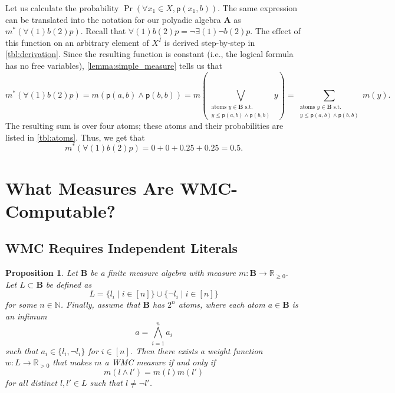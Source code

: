 \documentclass{article}
\newtheorem{proposition}{Proposition}
\theoremstyle{definition}
\theoremstyle{remark}
\begin{document}
Let us calculate the probability $\Pr(\forall x_1 \in X, \mathsf{p}(x_1, b))$.
The same expression can be translated into the notation for our polyadic algebra
$\mathbf{A}$ as $m^*(\bm\forall(1)b(2)p)$. Recall that $\bm\forall(1)b(2)p =
\neg\bm\exists(1)\neg b(2)p$. The effect of this function on an arbitrary
element of $X^I$ is derived step-by-step in \cref{tbl:derivation}. Since the
resulting function is constant (i.e., the logical formula has no free
variables), \cref{lemma:simple_measure} tells us that
\[
  m^*(\bm\forall(1)b(2)p) = m(\mathsf{p}(a, b) \land \mathsf{p}(b, b)) = m
  \left( \bigvee_{\substack{\text{atoms } y \in \mathbf{B} \text{ s.t.}\\
        y \le \mathsf{p}(a, b) \land \mathsf{p}(b, b)}} y \right) = \sum
  _{\substack{\text{atoms } y \in \mathbf{B} \text{ s.t.}\\
      y \le \mathsf{p}(a, b) \land \mathsf{p}(b, b)}} m(y).
\]
The resulting sum is over four atoms; these atoms and their probabilities are
listed in \cref{tbl:atoms}. Thus, we get that
\[
  m^*(\bm\forall(1)b(2)p) = 0 + 0 + 0.25 + 0.25 = 0.5.
\]

\section{What Measures Are WMC-Computable?}

\subsection{WMC Requires Independent Literals}


\begin{proposition}
  Let $\mathbf{B}$ be a finite measure algebra with measure $m : \mathbf{B} \to
  \mathbb{R}_{\ge 0}$. Let $L \subset \mathbf{B}$ be defined as
  \[
  L = \{ l_i \mid i \in [n] \} \cup \{ \neg l_i \mid i \in [n] \}
  \]
  for some $n \in \mathbb{N}$. Finally, assume that $\mathbf{B}$ has $2^n$
  atoms, where each atom $a \in \mathbf{B}$ is an infimum
  \[
    a = \bigwedge_{i=1}^n a_i
  \]
  such that $a_i \in \{ l_i, \neg l_i \}$ for $i \in [n]$. Then there exists a
  weight function $w : L \to \mathbb{R}_{>0}$ that makes $m$ a WMC measure if
  and only if
  \begin{equation} \label{eq:wmccondition}
  m(l \land l') = m(l)m(l')
  \end{equation}
  for all distinct $l, l' \in L$ such that $l \ne \neg l'$.
\end{proposition}
\end{document}
